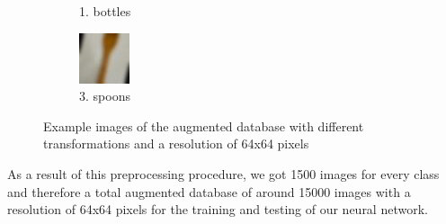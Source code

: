 \documentclass{tubaf-article}
\begin{document}
\begin{figure}[h!]
\begin{subfigure}[b]{0.3\textwidth}
			\caption{1. bottles}
			\label{fig:bild2}
		\end{subfigure}
		\hfill
		\begin{subfigure}[b]{0.3\textwidth}
			\centering
			\includegraphics[width=\textwidth]{3435_1.jpeg}
			\caption{3. spoons}
			\label{fig:bild2}
		\end{subfigure}
		\hfill
		\caption{Example images of the augmented database with different transformations and a resolution of 64x64 pixels}
		\label{fig:nebeneinander}
	\end{figure}
	As a result of this preprocessing procedure, we got 1500 images for every class and therefore a total augmented database of around 15000 images with a resolution of 64x64 pixels for the training and testing of our neural network. 
	
	
\end{document}
